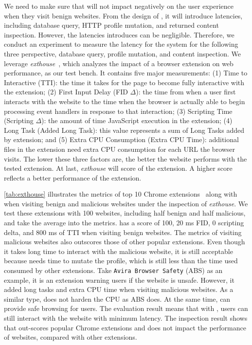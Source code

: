 We need to make sure that \spartacus will not impact negatively on the user experience when they visit benign websites.
From the design of \spartacus, it will introduce latencies, including database query, HTTP profile mutation, and returned content inspection.
However, the latencies \spartacus introduces can be negligible.
Therefore, we conduct an experiment to measure the latency for the \spartacus system for the following three perspective, database query, profile mutation, and content inspection.
We leverage \emph{exthouse}~\cite{exthouse}, which analyzes the impact of a browser extension on web performance, as our test bench.
It contains five major measurements:
(1) Time to Interactive (TTI): the time it takes for the page to become fully interactive with the extension; 
(2) First Input Delay (FID $\Delta$): the time from when a user first interacts with the website to the time when the browser is actually able to begin processing event handlers in response to that interaction;
(3) Scripting Time (Scripting $\Delta$): the amount of time JavaScript execution in the extension;
(4) Long Task (Added Long Task): this value represents a sum of Long Tasks added by extension;
and (5) Extra CPU Consumption (Extra CPU Time): additional files in the extension need extra CPU consumption for each URL the browser visits.
The lower these three factors are, the better the website performs with the tested extension.
At last, \emph{exthouse} will score of the extension.
A higher score reflects a better performance of the extension.

\exthouse

\autoref{tab:exthouse} illustrates the metrics of top 10 Chrome extensions~\cite{exthouse} along with \spartacus when visiting benign and malicious websites under the inspection of \emph{exthouse}.
We test these extensions with 100 websites, including half benign and half malicious, and take the average into the metrics.
\spartacus has a score of 100, 20 ms FID, 0 scripting delta, and 800 ms of TTI when visiting benign websites.
The metrics of \spartacus visiting malicious websites also outscores those of other popular extensions.
Even though it takes long time to interact with the malicious website, it is still acceptable because \spartacus needs time to mutate the profile, which is still less than the time used consumed by other extensions.
Take \texttt{Avira Browser Safety} (ABS) as an example, it is an extension warning users if the website is unsafe.
However, it added long tasks and extra CPU time when visiting malicious websites.
As a similar type, \spartacus does not harden the CPU as ABS does.
At the same time, \spartacus can provide safe browsing for users.
The evaluation result means that with \spartacus, users can still interact with the website with minimum latency.
The inspection result shows that \spartacus out-scores popular Chrome extensions and does not impact the performance of websites, compared with other extensions.

